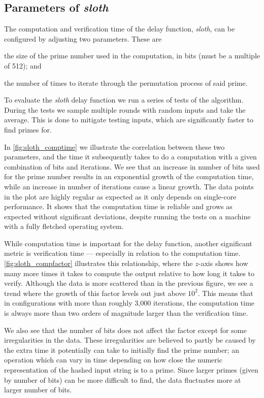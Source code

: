 
\subsection{Parameters of \textit{sloth}}%
\label{sub:sloth_parameters}
The computation and verification time of the delay function, \textit{sloth}, can be configured by adjusting two parameters.
These are
\begin{eletterate*}
\item the size of the prime number used in the computation, in bits (must be a multiple of 512); and
\item the number of times to iterate through the permutation process of said prime.
\end{eletterate*}

To evaluate the \textit{sloth} delay function we run a series of tests of the algorithm.
During the tests we sample multiple rounds with random inputs and take the average.
This is done to mitigate testing inputs, which are significantly faster to find primes for.

In \vref{fig:sloth_comptime} we illustrate the correlation between these two parameters, and the time it subsequently takes to do a computation with a given combination of bits and iterations.
We see that an increase in number of bits used for the prime number results in an exponential growth of the computation time, while an increase in number of iterations cause a linear growth.
The data points in the plot are highly regular as expected as it only depends on single-core performance.
It shows that the computation time is reliable and grows as expected without significant deviations, despite running the tests on a machine with a fully fletched operating system.

While computation time is important for the delay function, another significant metric is verification time --- especially in relation to the computation time.
\vref{fig:sloth_compfactor} illustrates this relationship, where the $z$-axis shows how many more times it takes to compute the output relative to how long it takes to verify.
Although the data is more scattered than in the previous figure, we see a trend where the growth of this factor levels out just above $10^2$.
This means that in configurations with more than roughly 3,000 iterations, the computation time is always more than two orders of magnitude larger than the verification time.

We also see that the number of bits does not affect the factor except for some irregularities in the data.
These irregularities are believed to partly be caused by the extra time it potentially can take to initially find the prime number; an operation which can vary in time depending on how close the numeric representation of the hashed input string is to a prime.
Since larger primes (given by number of bits) can be more difficult to find, the data fluctuates more at larger number of bits.
